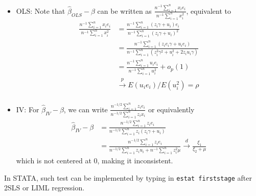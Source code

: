 \documentclass[12pt]{article}
\theoremstyle{definition}
\theoremstyle{property}
\theoremstyle{assumption}
\theoremstyle{example}
\theoremstyle{comment}
\begin{document}
\begin{itemize}
\item OLS: Note that $\hat{\beta}_{OLS}-\beta$ can be written as $\frac{n^{-1}\sum_{i=1}^n x_ie_i}{n^{-1}\sum_{i=1}^nx_i^2}$, equivalent to
\footnotesize{\[
\begin{aligned}
\frac{n^{-1}\sum_{i=1}^n x_ie_i}{n^{-1}\sum_{i=1}^nx_i^2}&=\frac{n^{-1}\sum_{i=1}^n (z_i\gamma+u_i)e_i}{n^{-1}\sum_{i=1}^n(z_i\gamma+u_i)^2}\\
&=\frac{n^{-1}\sum_{i=1}^n (z_ie_i\gamma+u_ie_i)}{n^{-1}\sum_{i=1}^n(z_i^2\gamma^2+u_i^2+2z_iu_i\gamma)}\\
&=\frac{n^{-1}\sum_{i=1}^n u_ie_i}{n^{-1}\sum_{i=1}^nu_i^2}+o_p(1)\\
&\xrightarrow{p}E(u_ie_i)/E(u_i^2)=\rho\\
\end{aligned}
\]}\normalsize
\item IV: For $\hat{\beta}_{IV}-\beta$, we can write $\frac{n^{-1/2}\sum_{i=1}^n z_ie_i}{n^{-1/2}\sum_{i=1}^nz_ix_i}$ or equivalently
\footnotesize{\[
\begin{aligned}
\hat{\beta}_{IV}-\beta&=\frac{n^{-1/2}\sum_{i=1}^n z_ie_i}{n^{-1/2}\sum_{i=1}^nz_i(z_i\gamma+u_i)}\\
&=\frac{n^{-1/2}\sum_{i=1}^n z_ie_i}{n^{-1/2}\sum_{i=1}^nz_iu_i+n^{-1}\sum_{i=1}^n z_i^2\mu}\xrightarrow{d}\frac{\xi_1}{\xi_2+\mu}
\end{aligned}
\]}\normalsize
which is not centered at 0, making it inconsistent. 
\end{itemize}\par
In STATA, such test can be implemented by typing in \texttt{estat firststage} after 2SLS or LIML regression. 
\end{document}
